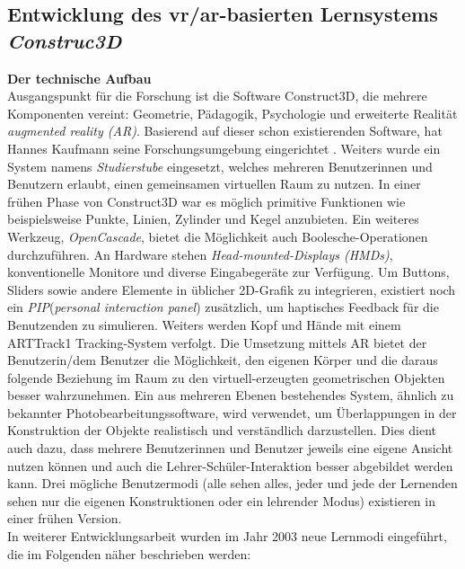 \documentclass[deutsch]{llncs}
\begin{document}
\subsection{Entwicklung des vr/ar-basierten Lernsystems \emph{Construc3D} }
\textbf{Der technische Aufbau} \\
Ausgangspunkt für die Forschung ist die Software Construct3D, die mehrere Komponenten vereint: Geometrie, Pädagogik, Psychologie und erweiterte Realität \emph{augmented reality (AR)}.
Basierend auf dieser schon existierenden Software, hat Hannes Kaufmann seine Forschungsumgebung eingerichtet \cite{Kaufmann:2002:MGE:1242073.1242086}. 
Weiters wurde ein System namens \emph{Studierstube} eingesetzt, welches mehreren Benutzerinnen und Benutzern erlaubt, einen gemeinsamen virtuellen Raum zu nutzen.
In einer frühen Phase von Construct3D war es möglich primitive Funktionen wie beispielsweise Punkte, Linien, Zylinder und Kegel anzubieten.
Ein weiteres Werkzeug, \emph{OpenCascade}, bietet die Möglichkeit auch Boolesche-Operationen durchzuführen.
An Hardware stehen \emph{Head-mounted-Displays (HMDs)}, konventionelle Monitore und diverse Eingabegeräte zur Verfügung. Um Buttons, Sliders sowie andere Elemente in üblicher 2D-Grafik zu integrieren, existiert noch ein \emph{PIP}(\emph{personal interaction panel})  zusätzlich, um haptisches Feedback für die Benutzenden zu simulieren. Weiters werden Kopf und Hände mit einem ARTTrack1 Tracking-System verfolgt.
Die Umsetzung mittels AR bietet der Benutzerin/dem Benutzer die Möglichkeit, den eigenen Körper und die daraus folgende Beziehung im Raum zu den virtuell-erzeugten geometrischen Objekten besser wahrzunehmen. 
Ein aus mehreren Ebenen bestehendes System, ähnlich zu bekannter Photobearbeitungssoftware, wird verwendet, um Überlappungen in der Konstruktion der Objekte realistisch und verständlich darzustellen. Dies dient auch dazu, dass mehrere Benutzerinnen und Benutzer jeweils eine eigene Ansicht nutzen können und auch die Lehrer-Schüler-Interaktion besser abgebildet werden kann. 
Drei mögliche Benutzermodi (alle sehen alles, jeder und jede der Lernenden sehen nur die eigenen Konstruktionen oder ein lehrender Modus) existieren in einer frühen Version. \\
In weiterer Entwicklungsarbeit wurden im Jahr 2003 neue Lernmodi eingeführt, die im Folgenden näher beschrieben werden:
\noindent \\
\end{document}
